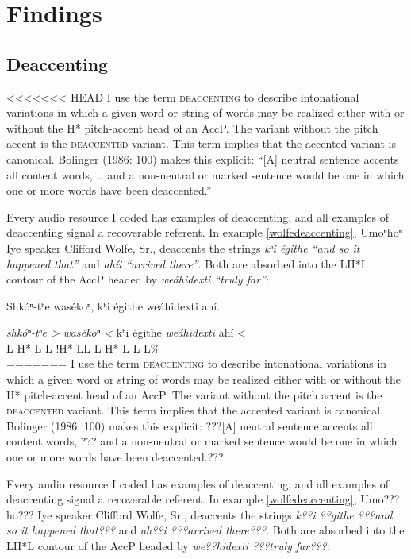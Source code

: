 \documentclass[output=paper]{LSP/langsci}
\begin{document}
\section{Findings}\label{findings}

\subsection{Deaccenting}\label{deaccenting}

<<<<<<< HEAD
	I use the term \textsc{deaccenting} to describe intonational variations in which a given word or string of words may be realized either with or without the H* pitch-accent head of an AccP. The variant without the pitch accent is the \textsc{deaccented} variant. This term implies that the accented variant is canonical. Bolinger (1986: 100) makes this explicit: “[A] neutral sentence accents all content words, … and a non-neutral or marked sentence would be one in which one or more words have been deaccented.”
	
Every audio resource I coded has examples of deaccenting, and all examples of deaccenting signal a recoverable referent. In example \ref{wolfedeaccenting}, Umoⁿhoⁿ Iye speaker Clifford Wolfe, Sr., deaccents the strings \textit{kʰi égithe “and so it happened that”} and \textit{ahíi “arrived there”}. Both are absorbed into the LH*L contour of the AccP headed by \textit{weáhidexti “truly far”}:

\ea\label{wolfedeaccenting}
Shkóⁿ-tʰe wasékoⁿ, kʰi égithe weáhidexti ahí.\footnotemark

\glll 	\emph{shkóⁿ-tʰe >}	\emph{wasékoⁿ <}		kʰi 		égithe 		\emph{weáhidexti}		{ahí <}\\
	{\ob L H* L\cb}		{\ob L !H* L\cb{}L}		{\ob L}	{}			{H* L}				{\cb{}L L\%}\\
=======
	I use the term \textsc{deaccenting} to describe intonational variations in which a given word or string of words may be realized either with or without the H* pitch-accent head of an AccP. The variant without the pitch accent is the \textsc{deaccented} variant. This term implies that the accented variant is canonical. Bolinger (1986: 100) makes this explicit: ???[A] neutral sentence accents all content words, ??? and a non-neutral or marked sentence would be one in which one or more words have been deaccented.???
	
Every audio resource I coded has examples of deaccenting, and all examples of deaccenting signal a recoverable referent. In example \ref{wolfedeaccenting}, Umo???ho??? Iye speaker Clifford Wolfe, Sr., deaccents the strings \textit{k??i ??githe ???and so it happened that???} and \textit{ah??i ???arrived there???}. Both are absorbed into the LH*L contour of the AccP headed by \textit{we??hidexti ???truly far???}:
\end{document}
